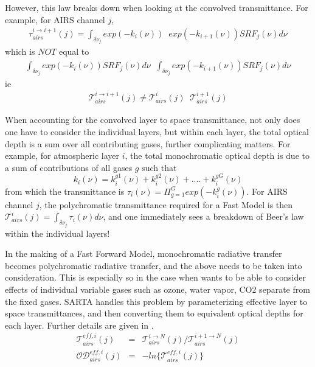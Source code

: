 \documentclass[11pt]{article}
\newcommand{\sa}{\textsf{SARTA}\xspace}
\begin{document}
However, this law breaks down when looking at the convolved transmittance. For example, for AIRS channel $j$,
\begin{eqnarray*}
  \tau_{airs}^{i \rightarrow i+1}(j) = \int_{\delta \nu_{j}} exp(-k_{i}(\nu)) \;\; exp(-k_{i+1}(\nu)) SRF_{j}(\nu) d\nu
\end{eqnarray*}
which is $NOT$ equal to 
\begin{eqnarray*}
  \int_{\delta \nu_{j}} exp(-k_{i}(\nu)) SRF_{j}(\nu) d\nu \;\; \int_{\delta \nu_{j}} exp(-k_{i+1}(\nu)) SRF_{j}(\nu) d\nu
\end{eqnarray*}
ie 
\begin{eqnarray*}
\mathcal{T}_{airs}^{i \rightarrow i+1}(j) \ne  \mathcal{T}_{airs}^{i}(j) \;\; \mathcal{T}_{airs}^{i+1}(j)
\end{eqnarray*}

When accounting for the convolved layer to space transmittance, not only does one have to consider the individual layers,
but within each layer, the total optical depth is a sum over all contributing gases, further complicating matters. 
For example, for atmospheric layer $i$, the total monochromatic optical depth is due to a sum of contributions of all 
gases $g$ such that 
\[
k_i(\nu) = k_i^{g1}(\nu) + k_i^{g2}(\nu) + .... + k_i^{gG}(\nu)
\]
from which the transmittance is $\tau_{i}(\nu) = \Pi_{g=1}^G exp(-k_i^{g}(\nu))$. For AIRS channel $j$, the polychromatic 
transmittance required for a Fast Model is then $\mathcal{T}_{airs}^{i}(j) = \int_{\delta \nu_{j}}  \tau_{i}(\nu) d\nu$, 
and one immediately sees a breakdown of Beer's law within the individual layers!

In the making of a Fast Forward Model, monochromatic radiative transfer becomes polychromatic radiative transfer, and 
the above needs to be taken into consideration. This is especially so in the case when wants to be able to consider 
effects of individual variable gases such as ozone, water vapor, CO2 separate from the fixed gases. \sa handles this 
problem by parameterizing effective layer to space transmittances, and then converting 
them to equivalent optical depths for each layer. Further details are given in \cite{han:02*1,str:02*2}.
\begin{eqnarray*}
\mathcal{T}^{eff,i}_{airs}(j) & = & \mathcal{T}_{airs}^{i \rightarrow N}(j) / \mathcal{T}_{airs}^{i+1 \rightarrow N}(j) \\
\mathcal{OD}^{eff,i}_{airs}(j) & = & -ln\{\mathcal{T}^{eff,i}_{airs}(j) \}
\end{eqnarray*}
\end{document}
